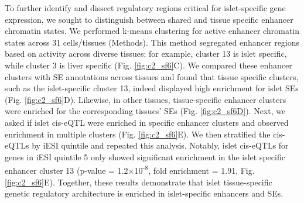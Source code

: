 To further identify and dissect regulatory regions critical for islet-specific gene expression, we sought to distinguish between shared and tissue specific enhancer chromatin states. We performed k-means clustering for active enhancer chromatin states across 31 cells/tissues (Methods). This method segregated enhancer regions based on activity across diverse tissues; for example, cluster 13 is islet specific, while cluster 3 is liver specific (Fig. \ref{fig:c2_sf6}C). We compared these enhancer clusters with SE annotations across tissues and found that tissue specific clusters, such as the islet-specific cluster 13, indeed displayed high enrichment for islet SEs (Fig. \ref{fig:c2_sf6}D). Likewise, in other tissues, tissue-specific enhancer clusters were enriched for the corresponding tissues’ SEs (Fig. \ref{fig:c2_sf6D}). Next, we asked if islet cis-eQTL were enriched in specific enhancer clusters and observed enrichment in multiple clusters (Fig. \ref{fig:c2_sf6}E). We then stratified the cis-eQTLs by iESI quintile and repeated this analysis. Notably, islet cis-eQTLs for genes in iESI quintile 5 only showed significant enrichment in the islet specific enhancer cluster 13 (p-value = 1.2$\times$10\textsuperscript{-8}, fold enrichment = 1.91, Fig. \ref{fig:c2_sf6}E). Together, these results demonstrate that islet tissue-specific genetic regulatory architecture is enriched in islet-specific enhancers and SEs.

